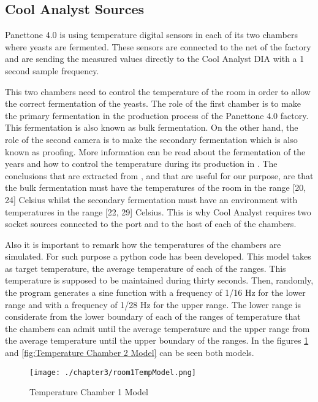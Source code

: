 \subsection{Cool Analyst Sources}

Panettone 4.0 is using temperature digital sensors in each of its two chambers where yeasts are fermented. These sensors are connected to the net of the factory and are sending the measured values directly to the Cool Analyst DIA with a 1 second sample frequency.

This two chambers need to control the temperature of the room in order to allow the correct fermentation of the yeasts. The role of the first chamber is to make the primary fermentation in the production process of the Panettone 4.0 factory. This fermentation is also known as bulk fermentation. On the other hand, the role of the second camera is to make the secondary fermentation which is also known as proofing. More information can be read about the fermentation of the years and how to control the temperature during its production in \cite{yeastfermentation}. The conclusions that are extracted from \cite{yeastfermentation}, and that are useful for our purpose, are that the bulk fermentation must have the temperatures of the room in the range [20, 24] Celsius whilst the secondary fermentation must have an environment with temperatures in the range [22, 29] Celsius. This is why Cool Analyst requires two socket sources connected to the port and to the host of each of the chambers.

Also it is important to remark how the temperatures of the chambers are simulated. For such purpose a python code has been developed. This model takes as target temperature, the average temperature of each of the ranges. This temperature is supposed to be maintained during thirty seconds. Then, randomly, the program generates a sine function with a frequency of 1/16 Hz for the lower range and with a frequency of 1/28 Hz for the upper range. The lower range is considerate from the lower boundary of each of the ranges of temperature that the chambers can admit until the average temperature and the upper range from the average temperature until the upper boundary of the ranges. In the figures \ref{fig:Temperature Chamber 1 Model} and \ref{fig:Temperature Chamber 2 Model} can be seen both models.

\begin{figure}
\centering
{\texttt{[image: ./chapter3/room1TempModel.png]}}
\caption{Temperature Chamber 1 Model}
\label{fig:Temperature Chamber 1 Model}
\end{figure}

